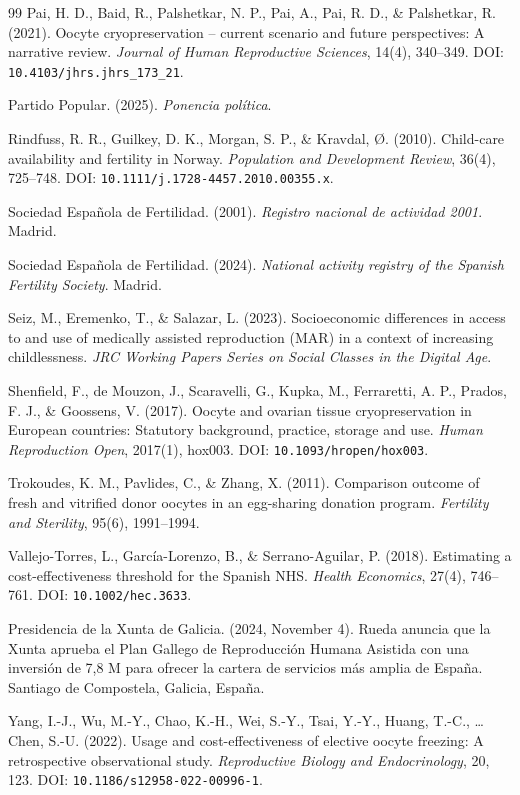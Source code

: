 \documentclass[12pt,a4paper]{article}
\begin{document}
\begin{thebibliography}{99}
Pai, H. D., Baid, R., Palshetkar, N. P., Pai, A., Pai, R. D., \&
Palshetkar, R. (2021). Oocyte cryopreservation -- current scenario and
future perspectives: A narrative review. \emph{Journal of Human
Reproductive Sciences}, 14(4), 340--349. DOI:
\nolinkurl{10.4103/jhrs.jhrs_173_21}.

Partido Popular. (2025). \emph{Ponencia pol\'itica}.

Rindfuss, R. R., Guilkey, D. K., Morgan, S. P., \& Kravdal, \O.
(2010). Child-care availability and fertility in Norway.
\emph{Population and Development Review}, 36(4), 725--748. DOI:
\nolinkurl{10.1111/j.1728-4457.2010.00355.x}.

Sociedad Espa\~nola de Fertilidad. (2001). \emph{Registro nacional de
actividad 2001}. Madrid.

Sociedad Espa\~nola de Fertilidad. (2024). \emph{National activity
registry of the Spanish Fertility Society}. Madrid.

Seiz, M., Eremenko, T., \& Salazar, L. (2023). Socioeconomic
differences in access to and use of medically assisted reproduction
(MAR) in a context of increasing childlessness. \emph{JRC Working
Papers Series on Social Classes in the Digital Age}.

Shenfield, F., de Mouzon, J., Scaravelli, G., Kupka, M., Ferraretti,
A. P., Prados, F. J., \& Goossens, V. (2017). Oocyte and ovarian tissue
cryopreservation in European countries: Statutory background, practice,
storage and use. \emph{Human Reproduction Open}, 2017(1), hox003. DOI:
\nolinkurl{10.1093/hropen/hox003}.

Trokoudes, K. M., Pavlides, C., \& Zhang, X. (2011). Comparison outcome
of fresh and vitrified donor oocytes in an egg-sharing donation program.
\emph{Fertility and Sterility}, 95(6), 1991--1994.

Vallejo-Torres, L., Garc\'ia-Lorenzo, B., \& Serrano-Aguilar, P.
(2018). Estimating a cost-effectiveness threshold for the Spanish NHS.
\emph{Health Economics}, 27(4), 746--761. DOI:
\nolinkurl{10.1002/hec.3633}.

Presidencia de la Xunta de Galicia. (2024, November 4). Rueda anuncia
que la Xunta aprueba el Plan Gallego de Reproducci\'on Humana Asistida
con una inversi\'on de 7,8 M\texteuro{} para ofrecer la cartera de
servicios m\'as amplia de Espa\~na. Santiago de Compostela, Galicia,
Espa\~na.

Yang, I.-J., Wu, M.-Y., Chao, K.-H., Wei, S.-Y., Tsai, Y.-Y., Huang,
T.-C., \ldots{} Chen, S.-U. (2022). Usage and cost-effectiveness of
elective oocyte freezing: A retrospective observational study.
\emph{Reproductive Biology and Endocrinology}, 20, 123. DOI:
\nolinkurl{10.1186/s12958-022-00996-1}.

\end{thebibliography}
\endgroup
\end{document}
